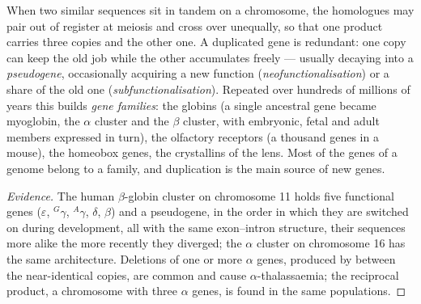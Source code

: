 \begin{proposition}\label{prop:b2:genome-diversification:duplication}
When two similar sequences sit in tandem on a chromosome, the
homologues may pair out of register at meiosis and cross over
unequally, so that one product carries three copies and the other
one. A duplicated gene is redundant: one copy can keep the old job
while the other accumulates  freely --- usually decaying
into a \emph{pseudogene}, occasionally acquiring a new function
(\emph{neofunctionalisation}) or a share of the old one
(\emph{subfunctionalisation}). Repeated over hundreds of millions of
years this builds \emph{gene families}: the globins (a single
ancestral gene became myoglobin, the $\alpha$ cluster and the
$\beta$ cluster, with embryonic, fetal and adult members expressed
in turn), the olfactory receptors (a thousand genes in a mouse), the
homeobox genes, the crystallins of the lens. Most of the genes of a
genome belong to a family, and duplication is the main source of new
genes.
\end{proposition}
\begin{proof}[Evidence]
The human $\beta$-globin cluster on chromosome 11 holds five
functional genes ($\varepsilon$, $^{G}\gamma$, $^{A}\gamma$,
$\delta$, $\beta$) and a pseudogene, in the order in which they are
switched on during development, all with the same exon--intron
structure, their sequences more alike the more recently they
diverged; the $\alpha$ cluster on chromosome 16 has the same
architecture. Deletions of one or more $\alpha$ genes, produced by
 between the near-identical copies, are common
and cause $\alpha$-thalassaemia; the reciprocal product, a
chromosome with three $\alpha$ genes, is found in the same
populations.
\end{proof}

